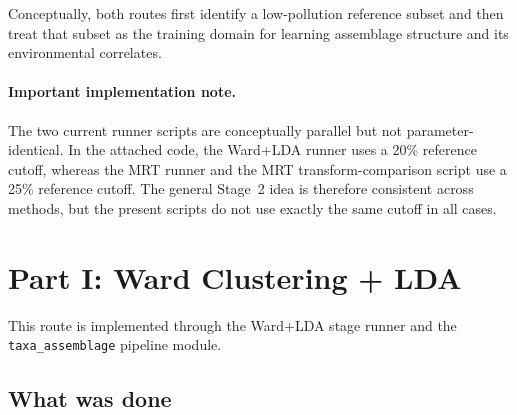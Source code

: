 \documentclass[11pt]{article}
\begin{document}
Conceptually, both routes first identify a low-pollution reference subset and then treat that subset as the training domain for learning assemblage structure and its environmental correlates.

\paragraph{Important implementation note.}
The two current runner scripts are conceptually parallel but not parameter-identical. In the attached code, the Ward+LDA runner uses a 20\% reference cutoff, whereas the MRT runner and the MRT transform-comparison script use a 25\% reference cutoff. The general Stage~2 idea is therefore consistent across methods, but the present scripts do not use exactly the same cutoff in all cases.

\section{Part I: Ward Clustering + LDA}

This route is implemented through the Ward+LDA stage runner and the
\texttt{taxa\_assemblage} pipeline module.

\subsection{What was done}
\end{document}
